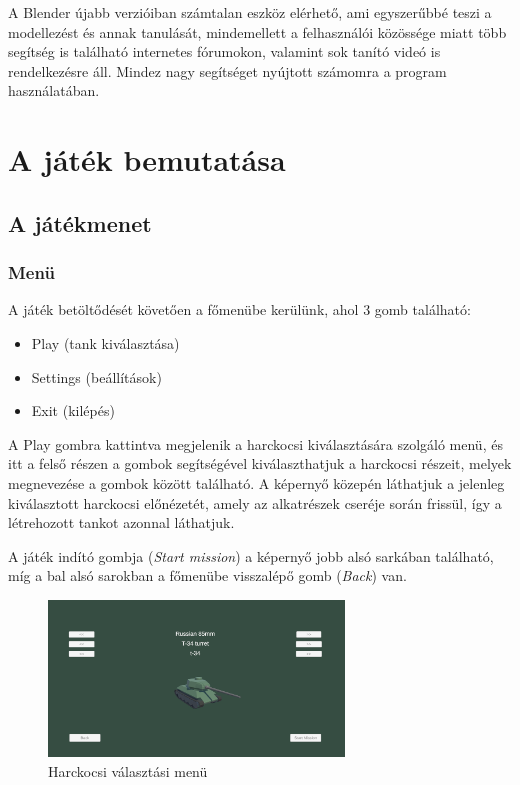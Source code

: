 \documentclass[
]{thesis-ekf}
\theoremstyle{definition}
\theoremstyle{remark}
\begin{document}
A Blender újabb verzióiban számtalan eszköz elérhető, ami egyszerűbbé teszi a modellezést és annak tanulását, mindemellett a felhasználói közössége miatt több segítség is található internetes fórumokon, valamint sok tanító videó is rendelkezésre áll. Mindez nagy segítséget nyújtott számomra a program használatában.

\chapter{A játék bemutatása}

\section{A játékmenet}

\subsection{Menü}

A játék betöltődését követően a főmenübe kerülünk, ahol 3 gomb található:
\begin{itemize}
 \item Play (tank kiválasztása)
 \item Settings (beállítások)
 \item Exit (kilépés)
\end{itemize}

A Play gombra kattintva megjelenik a harckocsi kiválasztására szolgáló menü, és itt a felső részen a gombok segítségével kiválaszthatjuk a harckocsi részeit, melyek megnevezése a gombok között található. A képernyő közepén láthatjuk a jelenleg kiválasztott harckocsi előnézetét, amely az alkatrészek cseréje során frissül, így a létrehozott tankot azonnal láthatjuk.

A játék indító gombja (\emph{Start mission}) a képernyő jobb alsó sarkában található, míg a bal alsó sarokban a főmenübe visszalépő gomb (\emph{Back}) van.


\begin{figure}[H]
    \centering
    \includegraphics[width=0.7\textwidth]{screenshots/selectionmenu.png}
    \caption{Harckocsi választási menü}
    \label{fig:selectionmenu}
\end{figure}
\end{document}
